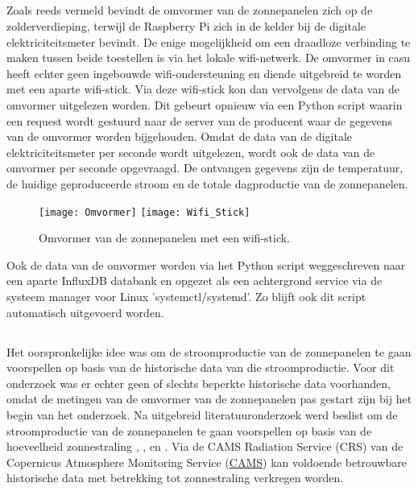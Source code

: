 \subsection{}%
\label{sec:Omvormer zonnepanelen uitlezen}

Zoals reeds vermeld bevindt de omvormer van de zonnepanelen zich op de zolderverdieping, terwijl de Raspberry Pi zich in de kelder bij de digitale elektriciteitsmeter bevindt. De enige mogelijkheid om een draadloze verbinding te maken tussen beide toestellen is via het lokale wifi-netwerk. De omvormer in casu heeft echter geen ingebouwde wifi-ondersteuning en diende uitgebreid te worden met een aparte wifi-stick. Via deze wifi-stick kon dan vervolgens de data van de omvormer uitgelezen worden. Dit gebeurt opnieuw via een Python script waarin een request wordt gestuurd naar de server van de producent waar de gegevens van de omvormer worden bijgehouden. Omdat de data van de digitale elektriciteitsmeter per seconde wordt uitgelezen, wordt ook de data van de omvormer per seconde opgevraagd. De ontvangen gegevens zijn de temperatuur, de huidige geproduceerde stroom en de totale dagproductie van de zonnepanelen. \\

\begin{figure}[h!]
    \centering
    \texttt{[image: Omvormer]} \hspace{0.5cm}
    \texttt{[image: Wifi\_Stick]}
    \caption{Omvormer van de zonnepanelen met een wifi-stick.}
\end{figure}

Ook de data van de omvormer worden via het Python script weggeschreven naar een aparte InfluxDB databank en opgezet als een achtergrond service via de systeem manager voor Linux 'systemctl/systemd'. Zo blijft ook dit script automatisch uitgevoerd worden.

\subsection{}%
\label{sec:Stroomproductie van zonnepanelen voorspellen met XGBoost}

Het oorspronkelijke idee was om de stroomproductie van de zonnepanelen te gaan voorspellen op basis van de historische data van die stroomproductie. Voor dit onderzoek was er echter geen of slechts beperkte historische data voorhanden, omdat de metingen van de omvormer van de zonnepanelen pas gestart zijn bij het begin van het onderzoek. Na uitgebreid literatuuronderzoek werd beslist om de stroomproductie van de zonnepanelen te gaan voorspellen op basis van de hoeveelheid zonnestraling  \autocite{Sehrawat2023}, \autocite{Ledmaoui2023}, \autocite{Wang2022} en \autocite{Sansine2023}. Via de CAMS Radiation Service (CRS) van de Copernicus Atmosphere Monitoring Service (\href{https://atmosphere.copernicus.eu}{CAMS}) kan voldoende betrouwbare historische data met betrekking tot zonnestraling verkregen worden.

